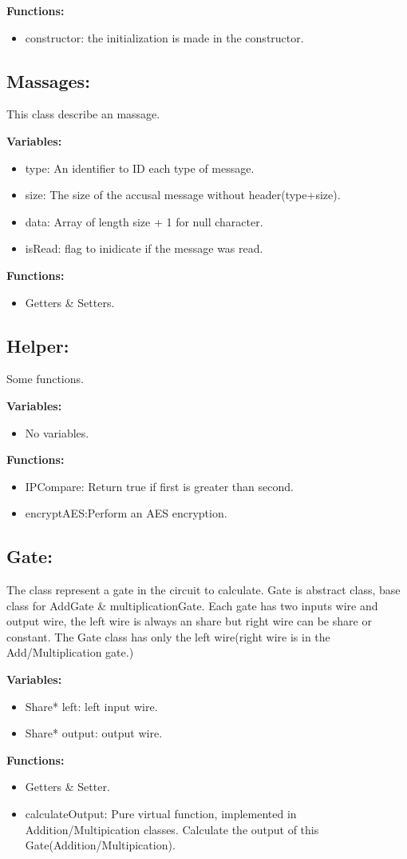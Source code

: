 \documentclass[12pt]{article}
\begin{document}
\textbf{Functions:}
\begin{itemize}
	\item constructor: the initialization is made in the constructor.
\end{itemize}
\subsection{Massages:}
This class describe an massage.\hfill\break

\textbf{Variables:}
\begin{itemize}
\item type: An identifier to ID each type of message.
\item size: The size of the accusal message without header(type+size).
\item data: Array of length size + 1 for null character.
\item isRead: flag to inidicate if the message was read.

\end{itemize}
\textbf{Functions:}
\begin{itemize}
	\item Getters \& Setters.
\end{itemize}
\subsection{Helper:}
Some functions.\hfill\break

\textbf{Variables:}
\begin{itemize}
\item No variables.
\end{itemize}
\textbf{Functions:}
\begin{itemize}
	\item IPCompare: Return true if first is greater than second.
	\item encryptAES:Perform an AES encryption.
\end{itemize}
\subsection{Gate:}
The class represent a gate in the circuit to calculate. Gate is abstract class, base class for AddGate \& multiplicationGate. Each gate has two inputs wire and output wire, the left wire is always an share but right wire can be share or constant. The Gate class has only the left wire(right wire is in the Add/Multiplication gate.) \hfill\break

\textbf{Variables:}
\begin{itemize}
	\item Share* left: left input wire.
	\item Share* output: output wire.
\end{itemize}
\textbf{Functions:}
\begin{itemize}

	\item Getters \& Setter.
	\item calculateOutput: Pure virtual function, implemented in Addition/Multipication classes. Calculate the output of this Gate(Addition/Multipication).

\end{itemize}
\end{document}
